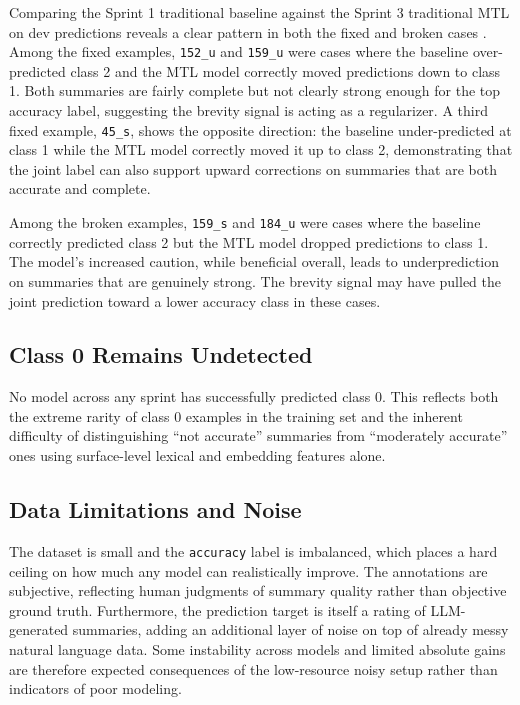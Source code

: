 \documentclass[11pt,twocolumn]{article}
\begin{document}
Comparing the Sprint 1 traditional baseline against the Sprint 3 traditional
MTL on dev predictions reveals a clear pattern in both the fixed and broken
cases \cite{claude_analysis}. Among the fixed examples, \texttt{152\_u} and
\texttt{159\_u} were cases where the baseline over-predicted class 2 and the
MTL model correctly moved predictions down to class 1. Both summaries are fairly
complete but not clearly strong enough for the top accuracy label, suggesting
the brevity signal is acting as a regularizer. A third fixed example,
\texttt{45\_s}, shows the opposite direction: the baseline under-predicted at
class 1 while the MTL model correctly moved it up to class 2, demonstrating
that the joint label can also support upward corrections on summaries that are
both accurate and complete.

Among the broken examples, \texttt{159\_s} and \texttt{184\_u} were cases where
the baseline correctly predicted class 2 but the MTL model dropped predictions
to class 1. The model's increased caution, while beneficial overall, leads to
underprediction on summaries that are genuinely strong. The brevity signal may
have pulled the joint prediction toward a lower accuracy class in these cases.

\subsection{Class 0 Remains Undetected}

No model across any sprint has successfully predicted class 0. This reflects
both the extreme rarity of class 0 examples in the training set and the
inherent difficulty of distinguishing ``not accurate'' summaries from
``moderately accurate'' ones using surface-level lexical and embedding features
alone.

\subsection{Data Limitations and Noise}

The dataset is small and the \texttt{accuracy} label is imbalanced, which
places a hard ceiling on how much any model can realistically improve. The
annotations are subjective, reflecting human judgments of summary quality rather
than objective ground truth. Furthermore, the prediction target is itself a
rating of LLM-generated summaries, adding an additional layer of noise on top
of already messy natural language data. Some instability across models and
limited absolute gains are therefore expected consequences of the low-resource
noisy setup rather than indicators of poor modeling.
\end{document}
